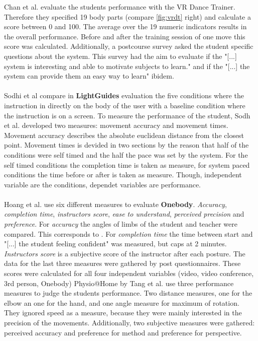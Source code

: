 Chan et al. evaluate the students performance with the VR Dance Trainer. Therefore they specified 19 body parts (compare \ref{fig:vrdt} right) and calculate a score between 0 and 100. The average over the 19 numeric indicators results in the overall performance. Before and after the training session of one move this score was calculated. Additionally, a postcourse survey asked the student specific questions about the system. This survey had the aim to evaluate if the "[...] system is interesting and able to motivate subjects to learn." \cite{Chan2011} and if the "[...] the system can provide them an easy way to learn" ibidem.\\ \\
Sodhi et al \cite{Sodhi2012} compare in \textbf{LightGuides} evaluation the five conditions where the instruction in directly on the body of the user with a baseline condition where the instruction is on a screen. To measure the performance of the student, Sodh et al. developed two measures: movement accuracy and movement times. Movement accuracy describes the absolute euclidean distance from the closest point. Movement times is devided in two sections by the reason that half of the conditions were self timed and the half the pace was set by the system. For the self timed conditions the completion time is taken as measure, for system paced conditions the time before or after is taken as measure. Though, independent variable are the conditions, dependet variables are performance.\\ \\
Hoang et al. \cite{Hoang2016} use six different measures to evaluate \textbf{Onebody}. \textit{Accuracy}, \textit{completion time}, \textit{instructors score}, \textit{ease to understand}, \textit{perceived precision} and \textit{preference}. For \textit{accuracy} the angles of limbs of the student and teacher were compared. This corresponds to \todo. For \textit{completion time} the time between start and "[...] the student feeling confident" was measured, but caps at 2 minutes. \textit{Instructors score} is a subjective score of the instructor after each posture. The data for the last three measures were gathered by post questionnaires. These scores were calculated for all four independent variables (video, video conference, 3rd person, Onebody)
Physio@Home by Tang et al. \cite{Tang2015} use three performance measures to judge the students performance. Two distance measures, one for the elbow an one for the hand, and one angle measure for maximum of rotation. They ignored speed as a measure, because they were mainly interested in the precision of the movements. Additionally, two subjective measures were gathered: perceived accuracy and preference for method and preference for perspective.

